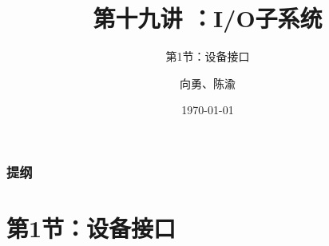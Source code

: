 


\title[第19讲]{第十九讲 ：I/O子系统} %
\subtitle{第1节：设备接口}
\author{向勇、陈渝} %
\date{\today} %



\begin{frame}
\titlepage %
\end{frame}

\begin{frame}
\frametitle{提纲} %
\tableofcontents %


\end{frame}
\section{第1节：设备接口} %
